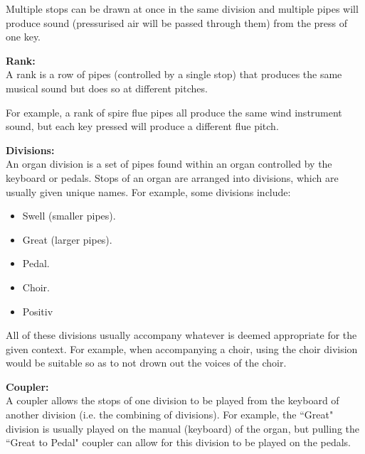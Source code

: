 Multiple stops can be drawn at once in the same division and multiple pipes will produce sound (pressurised air will be passed through them) from the press of one key. \cite{organvideo}

\medskip
\noindent \textbf{Rank:}
\\ \hspace*{0.5cm} A rank is a row of pipes (controlled by a single stop) that produces the same musical sound but does so at different pitches. 

For example, a rank of spire flue pipes all produce the same wind instrument sound, but each key pressed will produce a different flue pitch.  \cite{organvideo}

\medskip
\noindent \textbf{Divisions:}
\\ \hspace*{0.5cm} An organ division is a set of pipes found within an organ controlled by the keyboard or pedals. Stops of an organ are arranged into divisions, which are usually given unique names. For example, some divisions include:

\vspace{-0.15cm}
\begin{itemize}
    \itemsep0em 
\item Swell (smaller pipes).
\vspace{-0.1cm}
\item Great (larger pipes).
\vspace{-0.1cm}
\item Pedal.
\vspace{-0.1cm}
\item Choir.
\vspace{-0.1cm}
\item Positiv
\end{itemize}
\vspace{-0.15cm}

All of these divisions usually accompany whatever is deemed appropriate for the given context. For example, when accompanying a choir, using the choir division would be suitable so as to not drown out the voices of the choir. \cite{organvideo}

\medskip
\noindent \textbf{Coupler:}
\\ \hspace*{0.5cm} A coupler allows the stops of one division to be played from the keyboard of another division (i.e. the combining of divisions). For example, the ``Great" division is usually played on the manual (keyboard) of the organ, but pulling the ``Great to Pedal" coupler can allow for this division to be played on the pedals. \cite{organvideo}

